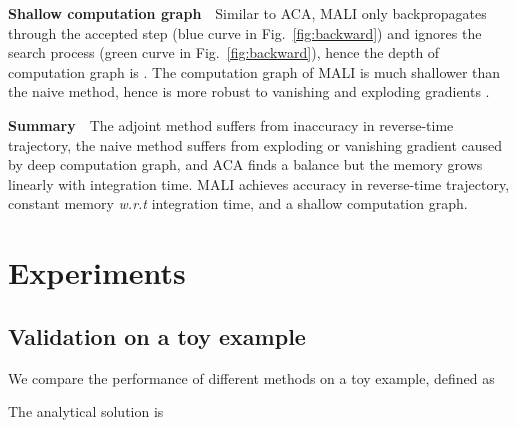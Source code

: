 \documentclass{article} \usepackage{iclr2021_conference,times}
\begin{document}
\textbf{Shallow computation graph}\ \ Similar to ACA, MALI only backpropagates through the accepted step (blue curve in Fig.~\ref{fig:backward}) and ignores the search process (green curve in Fig.~\ref{fig:backward}), hence the depth of computation graph is . The computation graph of MALI is much shallower than the naive method, hence is more robust to  vanishing and exploding gradients \citep{pascanu2013difficulty}.

\textbf{Summary}\ \ The adjoint method suffers from inaccuracy in reverse-time trajectory, the naive method suffers from exploding or vanishing gradient caused by deep computation graph, and ACA finds a balance but the memory grows linearly with integration time. MALI achieves accuracy in reverse-time trajectory, constant memory \textit{w.r.t} integration time, and a shallow computation graph.
\section{Experiments}
\label{sec:experiments}
\vspace{-1mm}
\subsection{Validation on a toy example}
We compare the performance of different methods on a toy example, defined as

The analytical solution is
\end{document}

